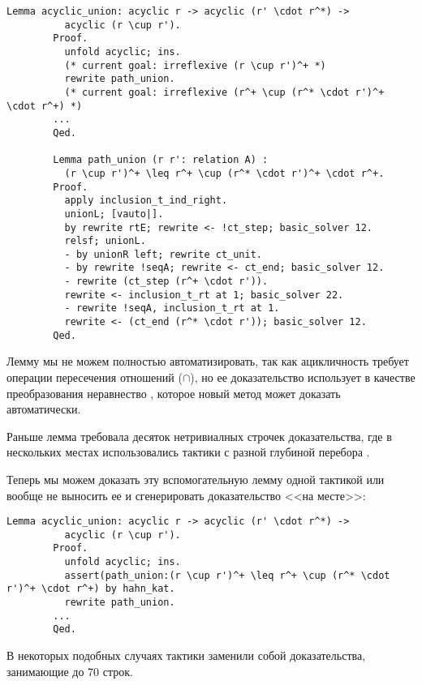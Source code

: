 \documentclass[times
              ,specification
              ,annotation
              ]{itmo-student-thesis}
\begin{document}
      \begin{lstlisting}[float=!h, gobble=8]
        Lemma acyclic_union: acyclic r -> acyclic (r' \cdot r^*) ->
          acyclic (r \cup r').
        Proof.
          unfold acyclic; ins.
          (* current goal: irreflexive (r \cup r')^+ *)
          rewrite path_union.
          (* current goal: irreflexive (r^+ \cup (r^* \cdot r')^+ \cdot r^+) *)
        ...
        Qed.

        Lemma path_union (r r': relation A) :
          (r \cup r')^+ \leq r^+ \cup (r^* \cdot r')^+ \cdot r^+.
        Proof.
          apply inclusion_t_ind_right.
          unionL; [vauto|].
          by rewrite rtE; rewrite <- !ct_step; basic_solver 12.
          relsf; unionL.
          - by unionR left; rewrite ct_unit.
          - by rewrite !seqA; rewrite <- ct_end; basic_solver 12.
          - rewrite (ct_step (r^+ \cdot r')).
          rewrite <- inclusion_t_rt at 1; basic_solver 22.
          - rewrite !seqA, inclusion_t_rt at 1.
          rewrite <- (ct_end (r^* \cdot r')); basic_solver 12.
        Qed.
      \end{lstlisting}

      Лемму  мы не можем полностью автоматизировать, так как ацикличность требует операции
      пересечения отношений ($\cap$), но ее доказательство использует в качестве преобразования
      неравнество , которое новый метод может доказать автоматически.

      Раньше лемма  требовала десяток нетривиалных строчек доказательства, где в
      нескольких местах использовались тактики с разной глубиной перебора .

      Теперь мы можем доказать эту вспомогательную лемму одной тактикой или вообще не выносить ее и
      сгенерировать доказательство <<на месте>>:

      \begin{lstlisting}[float=!h, gobble=8]
        Lemma acyclic_union: acyclic r -> acyclic (r' \cdot r^*) ->
          acyclic (r \cup r').
        Proof.
          unfold acyclic; ins.
          assert(path_union:(r \cup r')^+ \leq r^+ \cup (r^* \cdot r')^+ \cdot r^+) by hahn_kat.
          rewrite path_union.
        ...
        Qed.
      \end{lstlisting}

      В некоторых подобных случаях тактики  заменили собой доказательства, занимающие
      до 70 строк.
      
\end{document}
